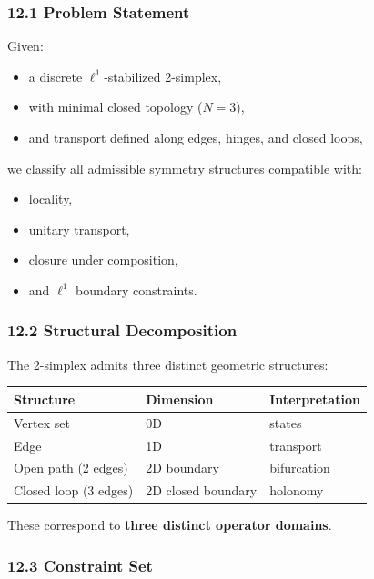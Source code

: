 \documentclass[
]{article}
\providecommand{\tightlist}{%
  \setlength{\itemsep}{0pt}\setlength{\parskip}{0pt}}
\begin{document}
\subsubsection{12.1 Problem Statement}\label{problem-statement-1}

Given:

\begin{itemize}
\tightlist
\item
  a discrete \(\ell^1\)-stabilized 2-simplex,
\item
  with minimal closed topology (\(N = 3\)),
\item
  and transport defined along edges, hinges, and closed loops,
\end{itemize}

we classify all admissible symmetry structures compatible with:

\begin{itemize}
\tightlist
\item
  locality,
\item
  unitary transport,
\item
  closure under composition,
\item
  and \(\ell^1\) boundary constraints.
\end{itemize}

\subsubsection{12.2 Structural
Decomposition}\label{structural-decomposition}

The 2-simplex admits three distinct geometric structures:

\begin{longtable}[]{@{}lll@{}}
\toprule\noalign{}
Structure & Dimension & Interpretation \\
\midrule\noalign{}
\endhead
\bottomrule\noalign{}
\endlastfoot
Vertex set & 0D & states \\
Edge & 1D & transport \\
Open path (2 edges) & 2D boundary & bifurcation \\
Closed loop (3 edges) & 2D closed boundary & holonomy \\
\end{longtable}

These correspond to \textbf{three distinct operator domains}.

\subsubsection{12.3 Constraint Set}\label{constraint-set}
\end{document}
